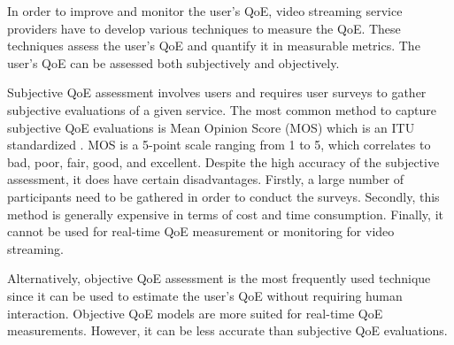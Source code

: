 In order to improve and monitor the user's QoE, video streaming service providers have to develop various techniques to measure the QoE.
These techniques assess the user's QoE and quantify it in measurable metrics.
The user's QoE can be assessed both subjectively and objectively.


Subjective QoE assessment involves users and requires user surveys to gather subjective evaluations of a given service.
The most common method to capture subjective QoE evaluations is Mean Opinion Score (MOS) which is an ITU standardized \citep{QoEAss_ITU}.
MOS is a 5-point scale ranging from 1 to 5, which correlates to bad, poor, fair, good, and excellent.
Despite the high accuracy of the subjective assessment, it does have certain disadvantages. Firstly, a large number of participants need to be gathered in order to conduct the surveys. Secondly, this method is generally expensive in terms of cost and time consumption. Finally, it cannot be used for real-time QoE measurement or monitoring for video streaming.


Alternatively, objective QoE assessment is the most frequently used technique since it can be used to estimate the user's QoE without requiring human interaction.
Objective QoE models are more suited for real-time QoE measurements. However, it can be less accurate than subjective QoE evaluations.
